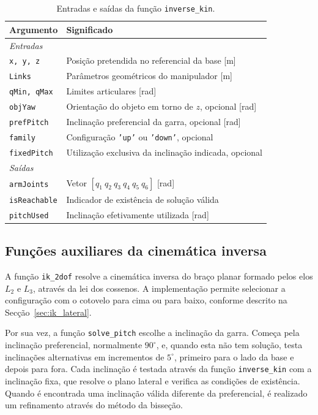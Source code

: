 \begin{table}[H]
    \centering
    \caption{Entradas e saídas da função \texttt{inverse\_kin}.}
    \label{tab:inverse_io}
    \small
    \begin{tabular}{lp{8.5cm}}
        \hline
        Argumento & Significado \\
        \hline
        \multicolumn{2}{l}{\textit{Entradas}} \\
        \texttt{x, y, z} & Posição pretendida no referencial da base [m] \\
        \texttt{Links} & Parâmetros geométricos do manipulador [m] \\
        \texttt{qMin, qMax} & Limites articulares [rad] \\
        \texttt{objYaw} & Orientação do objeto em torno de $z$, opcional [rad] \\
        \texttt{prefPitch} & Inclinação preferencial da garra, opcional [rad] \\
        \texttt{family} & Configuração \texttt{'up'} ou \texttt{'down'}, opcional \\
        \texttt{fixedPitch} & Utilização exclusiva da inclinação indicada, opcional \\
        \hline
        \multicolumn{2}{l}{\textit{Saídas}} \\
        \texttt{armJoints} & Vetor $[q_1\ q_2\ q_3\ q_4\ q_5\ q_6]$ [rad] \\
        \texttt{isReachable} & Indicador de existência de solução válida \\
        \texttt{pitchUsed} & Inclinação efetivamente utilizada [rad] \\
        \hline
    \end{tabular}
\end{table}

\subsection{Funções auxiliares da cinemática inversa}

A função \texttt{ik\_2dof} resolve a cinemática inversa do braço planar formado pelos elos $L_2$ e $L_3$, através da lei dos cossenos. A implementação permite selecionar a configuração com o cotovelo para cima ou para baixo, conforme descrito na Secção~\ref{sec:ik_lateral}.

Por sua vez, a função \texttt{solve\_pitch} escolhe a inclinação da garra. Começa pela inclinação preferencial, normalmente $90^\circ$, e, quando esta não tem solução, testa inclinações alternativas em incrementos de $5^\circ$, primeiro para o lado da base e depois para fora. Cada inclinação é testada através da função \texttt{inverse\_kin} com a inclinação fixa, que resolve o plano lateral e verifica as condições de existência. Quando é encontrada uma inclinação válida diferente da preferencial, é realizado um refinamento através do método da bisseção.

